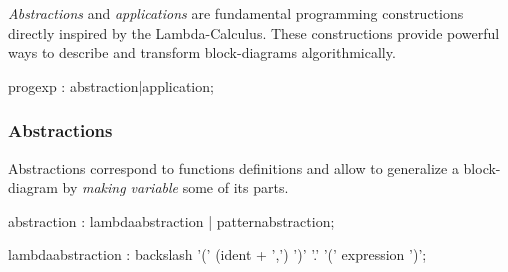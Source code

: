 \documentclass[a4paper,10pt]{book}
\begin{document}
\textit{Abstractions} and \textit{applications} are fundamental programming constructions directly inspired by the Lambda-Calculus. These constructions provide powerful ways to describe and transform block-diagrams algorithmically.


\begin{rail}
progexp : abstraction|application;
\end{rail}   
 
\subsubsection{Abstractions}

Abstractions correspond to functions definitions and allow to generalize a block-diagram by \textit{making variable} some of its parts. 

% 

\begin{rail}
abstraction : lambdaabstraction | patternabstraction; 
 
lambdaabstraction :  backslash '(' (ident + ',') ')' '.' '(' expression ')';
\end{rail}
\end{document}
